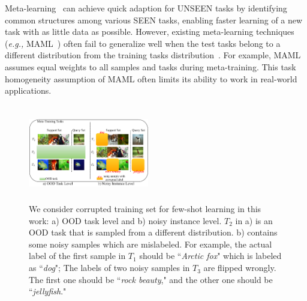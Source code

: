 Meta-learning~\citep{schmidhuber1987, Naik1992MetaneuralNT,santoro2016meta, vinyals2016matching, finn2017model} can achieve quick adaption for UNSEEN tasks by identifying common structures among various SEEN tasks, enabling faster learning of a new task with as little data as possible. 
However, existing meta-learning techniques (\emph{e.g.,} MAML~\citep{finn2017model}) often fail to generalize well when the test tasks belong to a different distribution from the training tasks distribution~\citep{Chen2019ICLR}. 
For example, MAML assumes equal weights to all samples and tasks during meta-training.
This task homogeneity assumption of MAML often limits its ability to work in real-world applications. 
\begin{figure}[!t]
    \centering
    \includegraphics[width=0.47\textwidth, height=4.2cm]{figs/outliers.pdf}
    \vspace{-7mm}
    \caption{We consider corrupted training set for few-shot learning in this work: a) OOD task level and b) noisy instance level. $T_2$ in a) is an OOD task that is sampled from a different distribution. b) contains some noisy samples which are mislabeled. For example, the actual label of the first sample in $T_1$ should be ``\textit{Arctic fox}" which is labeled as ``\textit{dog}"; The labels of two noisy samples in $T_3$ are flipped wrongly. The first one should be ``\textit{rock beauty}," and the other one should be ``\textit{jellyfish}."}
    \label{fig:motivation}
\vspace{-8mm}
\end{figure}


